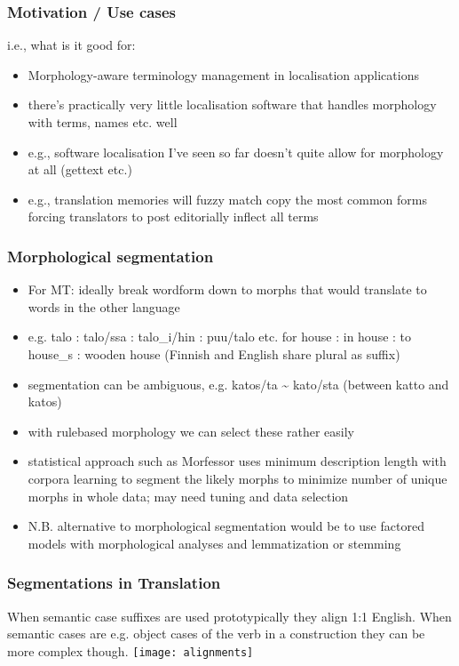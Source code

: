 \documentclass{beamer}
\begin{document}
\begin{frame}
    \frametitle{Motivation / Use cases}
    i.e., what is it good for:
    \begin{itemize}
        \item Morphology-aware terminology management in localisation
            applications
        \item there's practically very little localisation software that
            handles morphology with terms, names etc. well
        \item e.g., software localisation I've seen so far doesn't quite allow
            for morphology at all (gettext etc.)
        \item e.g., translation memories will fuzzy match copy the most common
            forms forcing translators to post editorially inflect all terms
    \end{itemize}
\end{frame}

\begin{frame}
    \frametitle{Morphological segmentation}
    \begin{itemize}
        \item For MT: ideally break wordform down to morphs that would translate
            to words in the other language
        \item e.g. talo : talo/ssa : talo\_i/hin : puu/talo etc. for house : in house : to house\_s : wooden house (Finnish and English share plural as suffix)
        \item segmentation can be ambiguous, e.g. katos/ta \textasciitilde{}
            kato/sta (between katto and katos)
        \item with rulebased morphology we can select these rather easily
        \item statistical approach such as Morfessor uses minimum description
            length with corpora learning to segment the likely morphs to
            minimize number of unique morphs in whole data; may need tuning
            and data selection
        \item N.B. alternative to morphological segmentation would be to use
            factored models with morphological analyses and lemmatization or
            stemming
    \end{itemize}
\end{frame}

\begin{frame}
    \frametitle{Segmentations in Translation}
    When semantic case suffixes are used prototypically they align 1:1 English.
    When semantic cases are e.g. object cases of the verb in a construction
    they can be more complex though.
    \texttt{[image: alignments]}
\end{frame}
\end{document}
